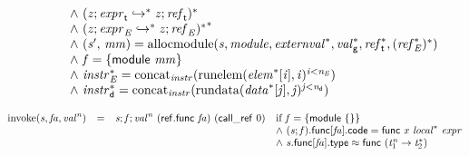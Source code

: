 $$\begin{array}{@{}lcl@{}l@{}}
 &&&\quad {\land}~({\mathit{z}} ; {\mathit{expr}}_{{\mathsf{t}}} \hookrightarrow^\ast {\mathit{z}} ; {\mathit{ref}}_{{\mathsf{t}}})^\ast \\
 &&&\quad {\land}~{({\mathit{z}} ; {\mathit{expr}}_{{\mathit{E}}} \hookrightarrow^\ast {\mathit{z}} ; {\mathit{ref}}_{{\mathit{E}}})^\ast}^\ast \\
 &&&\quad {\land}~({\mathit{s}'},\, {\mathit{mm}}) = {\mathrm{allocmodule}}({\mathit{s}}, {\mathit{module}}, {{\mathit{externval}}^\ast}, {{\mathit{val}}_{{\mathsf{g}}}^\ast}, {{\mathit{ref}}_{{\mathsf{t}}}^\ast}, {({{\mathit{ref}}_{{\mathit{E}}}^\ast})^\ast}) \\
 &&&\quad {\land}~{\mathit{f}} = \{ \begin{array}[t]{@{}l@{}}
\mathsf{module}~{\mathit{mm}} \}\end{array} \\
 &&&\quad {\land}~{{\mathit{instr}}_{{\mathit{E}}}^\ast} = {{\mathrm{concat}}}_{{\mathit{instr}}}({{\mathrm{runelem}}({{\mathit{elem}}^\ast}{}[{\mathit{i}}], {\mathit{i}})^{{\mathit{i}}<{\mathit{n}}_{{\mathit{E}}}}}) \\
 &&&\quad {\land}~{{\mathit{instr}}_{{\mathsf{d}}}^\ast} = {{\mathrm{concat}}}_{{\mathit{instr}}}({{\mathrm{rundata}}({{\mathit{data}}^\ast}{}[{\mathit{j}}], {\mathit{j}})^{{\mathit{j}}<{\mathit{n}}_{{\mathsf{d}}}}}) \\
\end{array}
$$

\vspace{1ex}

$$
\begin{array}{@{}lcl@{}l@{}}
{\mathrm{invoke}}({\mathit{s}}, {\mathit{fa}}, {{\mathit{val}}^{{\mathit{n}}}}) &=& {\mathit{s}} ; {\mathit{f}} ; {{\mathit{val}}^{{\mathit{n}}}}~(\mathsf{ref.func}~{\mathit{fa}})~(\mathsf{call\_ref}~0) &\quad
  \mbox{if}~{\mathit{f}} = \{ \begin{array}[t]{@{}l@{}}
\mathsf{module}~\{ \begin{array}[t]{@{}l@{}}
 \}\end{array} \}\end{array} \\
 &&&\quad {\land}~({\mathit{s}} ; {\mathit{f}}).\mathsf{func}{}[{\mathit{fa}}].\mathsf{code} = \mathsf{func}~{\mathit{x}}~{{\mathit{local}}^\ast}~{\mathit{expr}} \\
 &&&\quad {\land}~{\mathit{s}}.\mathsf{func}{}[{\mathit{fa}}].\mathsf{type} \approx \mathsf{func}~({{\mathit{t}}_{{1}}^{{\mathit{n}}}} \rightarrow {{\mathit{t}}_{{2}}^\ast}) \\
\end{array}
$$

